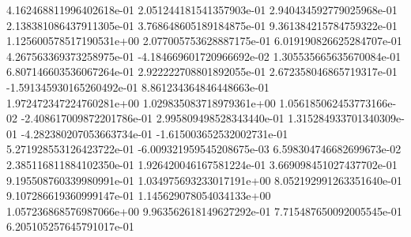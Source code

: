 	4.162468811996402618e-01	2.051244181541357903e-01	2.940434592779025968e-01	2.138381086437911305e-01	3.768648605189184875e-01	9.361384215784759322e-01	1.125600578517190531e+00	2.077005753628887175e-01	6.019190826625284707e-01	4.267563369373258975e-01	-4.184669601720966692e-02	1.305535665635670084e-01	6.807146603536067264e-01	2.922222708801892055e-01	2.672358046865719317e-01	-1.591345930165260492e-01	8.861234364846448663e-01	1.972472347224760281e+00	1.029835083718979361e+00	1.056185062453773166e-02	-2.408617009872201786e-01	2.995809498528343440e-01	1.315284933701340309e-01	-4.282380207053663734e-01	-1.615003652532002731e-01	5.271928553126423722e-01	-6.009321959545208675e-03	6.598304746682699673e-02	2.385116811884102350e-01	1.926420046167581224e-01	3.669098451027437702e-01	9.195508760339980991e-01	1.034975693233017191e+00	8.052192991263351640e-01	9.107286619360999147e-01	1.145629078054034133e+00	1.057236868576987066e+00	9.963562618149627292e-01	7.715487650092005545e-01	6.205105257645791017e-01
